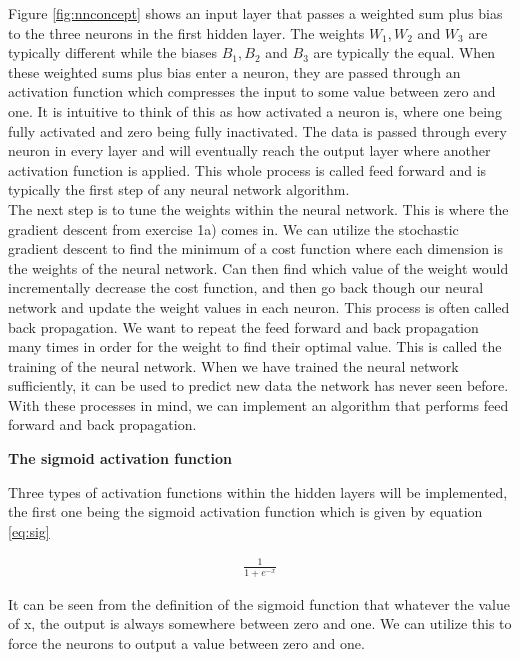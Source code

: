 \documentclass[12pt,a4paper]{article}
\begin{document}
\noindent Figure \ref{fig:nnconcept} shows an input layer that passes a weighted sum plus bias to the three neurons in the first hidden layer. The weights $W_1, W_2$ and $W_3$ are typically different while the biases $B_1, B_2$ and $B_3$ are typically the equal. When these weighted sums plus bias enter a neuron, they are passed through an activation function which compresses the input to some value between zero and one. It is intuitive to think of this as how activated a neuron is, where one being fully activated and zero being fully inactivated. The data is passed through every neuron in every layer and will eventually reach the output layer where another activation function is applied. This whole process is called feed forward and is typically the first step of any neural network algorithm.
\\
The next step is to tune the weights within the neural network. This is where the gradient descent from exercise 1a) comes in. We can utilize the stochastic gradient descent to find the minimum of a cost function where each dimension is the weights of the neural network. Can then find which value of the weight would incrementally decrease the cost function, and then go back though our neural network and update the weight values in each neuron. This process is often called back propagation. We want to repeat the feed forward and back propagation many times in order for the weight to find their optimal value. This is called the training of the neural network. When we have trained the neural network sufficiently, it can be used to predict new data the network has never seen before. With these processes in mind, we can implement an algorithm that performs feed forward and back propagation.

\begin{center}
\large{\textbf{The sigmoid activation function}}
\end{center}

\noindent Three types of activation functions within the hidden layers will be implemented, the first one being the sigmoid activation function which is given by equation \ref{eq:sig}

\begin{equation}\label{eq:sig}
\begin{aligned}
\frac{1}{1 + e^{-x}}
\end{aligned}
\end{equation}

\noindent It can be seen from the definition of the sigmoid function that whatever the value of x, the output is always somewhere between zero and one. We can utilize this to force the neurons to output a value between zero and one.
\end{document}

